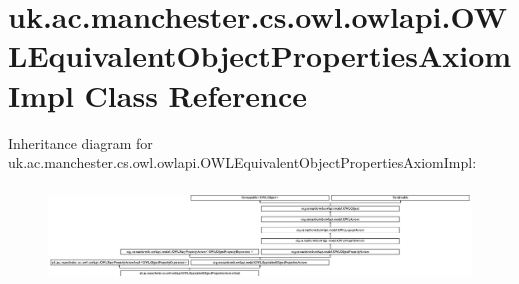 \hypertarget{classuk_1_1ac_1_1manchester_1_1cs_1_1owl_1_1owlapi_1_1_o_w_l_equivalent_object_properties_axiom_impl}{\section{uk.\-ac.\-manchester.\-cs.\-owl.\-owlapi.\-O\-W\-L\-Equivalent\-Object\-Properties\-Axiom\-Impl Class Reference}
\label{classuk_1_1ac_1_1manchester_1_1cs_1_1owl_1_1owlapi_1_1_o_w_l_equivalent_object_properties_axiom_impl}
}
Inheritance diagram for uk.\-ac.\-manchester.\-cs.\-owl.\-owlapi.\-O\-W\-L\-Equivalent\-Object\-Properties\-Axiom\-Impl\-:\begin{figure}[H]
\begin{center}
\leavevmode
\includegraphics[height=2.588099cm]{classuk_1_1ac_1_1manchester_1_1cs_1_1owl_1_1owlapi_1_1_o_w_l_equivalent_object_properties_axiom_impl}
\end{center}
\end{figure}
